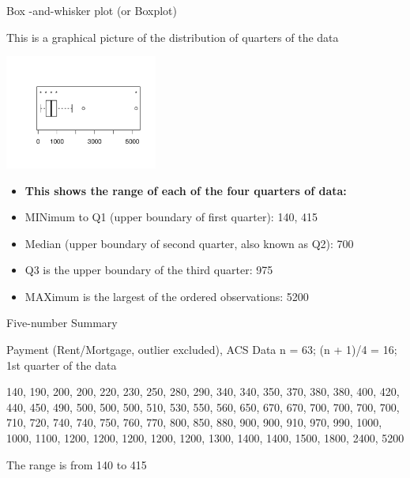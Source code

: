 \documentclass[14pt]{beamer}\usepackage[]{graphicx}\usepackage[]{color}
\begin{document}
\begin{frame}[fragile]{Box -and-whisker plot  (or Boxplot)}

\begin{minipage}[ht]{6cm}

{\small{
This is a graphical picture of the  distribution of quarters of the  data
}}
\end{minipage}
\begin{minipage}[ht]{5cm}


\includegraphics[width=5cm]{figure/LBL2Aa-1} 

\end{minipage}

{\footnotesize{
\begin{itemize}
\item \textbf{This shows the range of each of the four quarters of data:}  
\item MINimum to Q1 (upper boundary of first quarter): 140, 415
\item Median (upper boundary of second quarter, also known as Q2): 700  
\item Q3 is the upper boundary of the third quarter: 975
\item MAXimum is the largest of the ordered observations: 5200
\end{itemize}
}}

\end{frame}

\begin{frame}[fragile]{Five-number Summary}

Payment (Rent/Mortgage, outlier excluded), ACS Data
n = 63;	(n + 1)/4 = 16;	1st quarter of the data 

\vspace{3mm}

140, 190, 200, 200, 220, 230, 250, 280, 290, 340, 340, 350, 370, 380, 380, 400, 420, 440, 450, 490, 500, 500, 500, 510, 530, 550, 560, 650, 670, 670, 700, 700, 700, 700, 710, 720, 740, 740, 750, 760, 770, 800, 850, 880, 900, 900, 910, 970, 990, 1000, 1000, 1100, 1200, 1200, 1200, 1200, 1200, 1300, 1400, 1400, 1500, 1800, 2400, 5200

\vspace{3mm}

The range is from 140 to 415
\end{frame}
\end{document}

